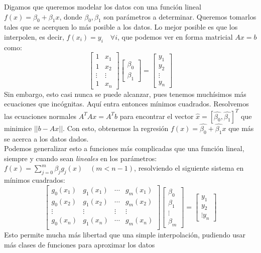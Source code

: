 \documentclass[12pt]{article}
\begin{document}
Digamos que queremos modelar los datos con una función lineal $f(x) = \beta_0 + \beta_1 x$, donde $\beta_0,\beta_1$ son parámetros a determinar. Queremos tomarlos tales que se acerquen lo más posible a los datos. Lo mejor posible es que los interpolen, es decir, $f(x_i) = y_i \quad \forall i$, que podemos ver en forma matricial $Ax=b$ como:
\[ \begin{bmatrix} 1 & x_1  \\ 1 & x_2  \\ \vdots & \vdots  \\ 1 & x_n \end{bmatrix} \begin{bmatrix} \beta_0 \\ \beta_1 \end{bmatrix} = \begin{bmatrix} y_1 \\ y_2 \\ \vdots \\ y_n \end{bmatrix}\]
Sin embargo, esto casi nunca se puede alcanzar, pues tenemos muchísimos más ecuaciones que incógnitas. Aquí entra entonces mínimos cuadrados. Resolvemos las ecuaciones normales $A^T A x = A^T b$ para encontrar el vector $\hat{x} = [\hat{\beta_0},\hat{\beta_1}]^T$ que minimice $||b-Ax||$. Con esto, obtenemos la regresión $f(x) = \hat{\beta_0} + \hat{\beta_1}x$ que más se acerca a los datos dados.\\
Podemos generalizar esto a funciones más complicadas que una función lineal, siempre y cuando sean \textit{lineales} en los parámetros: $f(x) = \sum_{j=0}^m \beta_j g_j(x) \quad (m<n-1)$, resolviendo el siguiente sistema en mínimos cuadrados:
\[ \begin{bmatrix}
    g_0(x_1) & g_1(x_1) & \cdots & g_m(x_1) \\
    g_0(x_2) & g_1(x_2) & \cdots & g_m(x_2) \\
    \vdots & \vdots & \vdots & \vdots \\
    g_0(x_n) & g_1(x_n) & \cdots & g_m(x_n) \\
\end{bmatrix}\begin{bmatrix}
    \beta_0 \\
    \beta_1 \\
    \vdots \\
    \beta_m
\end{bmatrix} = \begin{bmatrix}
    y_1 \\
    y_2 \\
    \vdots
    y_n
\end{bmatrix} \]
Esto permite mucha más libertad que una simple interpolación, pudiendo usar más clases de funciones para aproximar los datos
\end{document}
